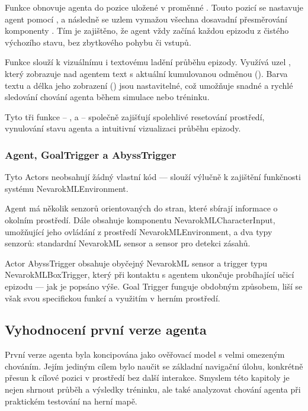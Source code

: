 Funkce  obnovuje agenta do pozice uložené v proměnné . Touto pozicí se nastavuje agent pomocí , a následně se uzlem  vymažou všechna dosavadní přesměrování komponenty . Tím je zajištěno, že agent vždy začíná každou epizodu z čistého výchozího stavu, bez zbytkového pohybu či vstupů.

Funkce  slouží k vizuálnímu i textovému ladění průběhu epizody. Využívá uzel , který zobrazuje nad agentem text s aktuální kumulovanou odměnou (). Barva textu a délka jeho zobrazení () jsou nastavitelné, což umožňuje snadné a rychlé sledování chování agenta během simulace nebo tréninku.

Tyto tři funkce – ,  a  – společně zajišťují spolehlivé resetování prostředí, vynulování stavu agenta a intuitivní vizualizaci průběhu epizody.

\subsubsection{Agent, GoalTrigger a AbyssTrigger}
Tyto Actors neobsahují žádný vlastní kód — slouží výlučně k zajištění funkčnosti systému NevarokMLEnvironment.

Agent má několik senzorů orientovaných do stran, které sbírají informace o okolním prostředí. Dále obsahuje komponentu NevarokMLCharacterInput, umožňující jeho ovládání z prostředí NevarokMLEnvironment, a dva typy senzorů: standardní NevarokML sensor a sensor pro detekci zásahů.

Actor AbyssTrigger obsahuje obyčejný NevarokML sensor a trigger typu NevarokMLBoxTrigger, který při kontaktu s agentem ukončuje probíhající učicí epizodu — jak je popsáno výše. Goal Trigger funguje obdobným způsobem, liší se však svou specifickou funkcí a využitím v herním prostředí.

\newpage

\subsection{Vyhodnocení první verze agenta}

První verze agenta byla koncipována jako ověřovací model s velmi omezeným chováním. Jejím jediným cílem bylo naučit se základní navigační úlohu, konkrétně přesun k cílové pozici v prostředí bez další interakce. Smyslem této kapitoly je nejen shrnout průběh a výsledky tréninku, ale také analyzovat chování agenta při praktickém testování na herní mapě.

